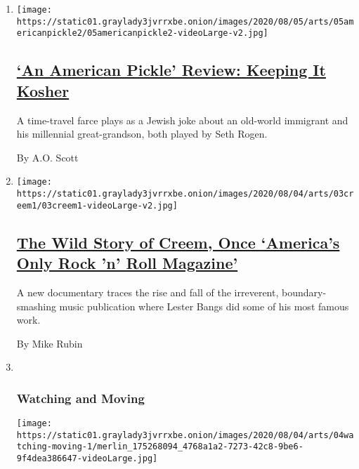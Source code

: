\begin{enumerate}
\def\labelenumi{\arabic{enumi}.}
\item
  \texttt{[image: https://static01.graylady3jvrrxbe.onion/images/2020/08/05/arts/05americanpickle2/05americanpickle2-videoLarge-v2.jpg]}

  \hypertarget{an-american-pickle-review-keeping-it-kosher}{%
  \subsection{\texorpdfstring{\href{/2020/08/04/movies/an-american-pickle-review.html}{`An
  American Pickle' Review: Keeping It
  Kosher}}{`An American Pickle' Review: Keeping It Kosher}}\label{an-american-pickle-review-keeping-it-kosher}}

  A time-travel farce plays as a Jewish joke about an old-world
  immigrant and his millennial great-grandson, both played by Seth
  Rogen.

  By A.O. Scott
\item
  \texttt{[image: https://static01.graylady3jvrrxbe.onion/images/2020/08/04/arts/03creem1/03creem1-videoLarge-v2.jpg]}

  \hypertarget{the-wild-story-of-creem-once-americas-only-rock-n-roll-magazine}{%
  \subsection{\texorpdfstring{\href{/2020/08/03/arts/music/creem-magazine-documentary.html}{The
  Wild Story of Creem, Once `America's Only Rock 'n' Roll
  Magazine'}}{The Wild Story of Creem, Once `America's Only Rock 'n' Roll Magazine'}}\label{the-wild-story-of-creem-once-americas-only-rock-n-roll-magazine}}

  A new documentary traces the rise and fall of the irreverent,
  boundary-smashing music publication where Lester Bangs did some of his
  most famous work.

  By Mike Rubin
\item ~
  \hypertarget{watching-and-moving}{%
  \subsubsection{Watching and Moving}\label{watching-and-moving}}

  \texttt{[image: https://static01.graylady3jvrrxbe.onion/images/2020/08/04/arts/04watching-moving-1/merlin\_175268094\_4768a1a2-7273-42c8-9be6-9f4dea386647-videoLarge.jpg]}

  \hypertarget{the-vail-all-stars-san-francisco-dreaming-and-black-lives-matter}{%
}
\end{enumerate}

